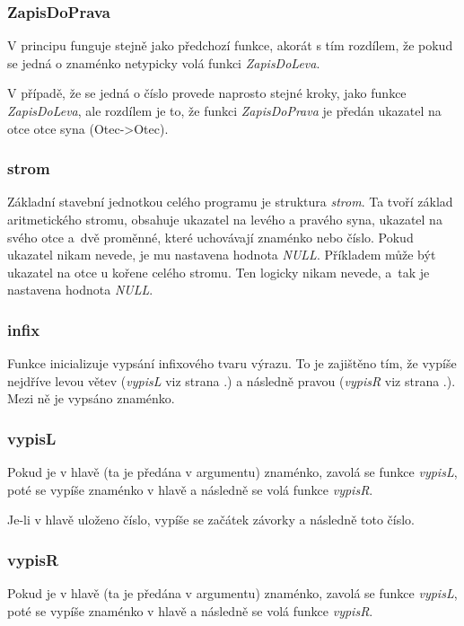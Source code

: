 \documentclass[12pt,a4paper]{report}
\begin{document}
\subsubsection{ZapisDoPrava} \label{ZDP}
V principu funguje stejně jako předchozí funkce, akorát s tím rozdílem, že pokud se jedná o znaménko netypicky volá funkci \textit{ZapisDoLeva}.  

V případě, že se jedná o číslo provede naprosto stejné kroky, jako funkce  \textit{ZapisDoLeva}, ale rozdílem je to, že funkci \textit{ZapisDoPrava} je předán ukazatel na otce otce syna (Otec->Otec).


\subsubsection{strom} \label{strom}
Základní stavební jednotkou celého programu je struktura \textit{strom}. Ta tvoří základ aritmetického stromu, obsahuje ukazatel na levého a pravého syna, ukazatel na svého otce a~dvě proměnné, které uchovávají znaménko nebo číslo. Pokud ukazatel nikam nevede, je mu nastavena hodnota \textit{NULL}. Příkladem může být ukazatel na otce u kořene celého stromu. Ten logicky nikam nevede, a~tak je nastavena hodnota \textit{NULL}. 

\subsubsection{infix} \label{infix}
Funkce inicializuje vypsání infixového tvaru výrazu. To je zajištěno tím, že vypíše nejdříve levou větev (\textit{vypisL} viz strana \pageref{vL}.) a následně pravou (\textit{vypisR} viz strana \pageref{vR}.). Mezi ně je vypsáno znaménko.

\subsubsection{vypisL} \label{vL}
Pokud je v hlavě (ta je předána v argumentu) znaménko, zavolá se funkce \textit{vypisL}, poté se vypíše znaménko v hlavě a následně se volá funkce \textit{vypisR}. 

Je-li v hlavě uloženo číslo, vypíše se začátek závorky a následně toto číslo. 

\subsubsection{vypisR} \label{vR}
Pokud je v hlavě (ta je předána v argumentu) znaménko, zavolá se funkce \textit{vypisL}, poté se vypíše znaménko v hlavě a následně se volá funkce \textit{vypisR}. 
\end{document}
